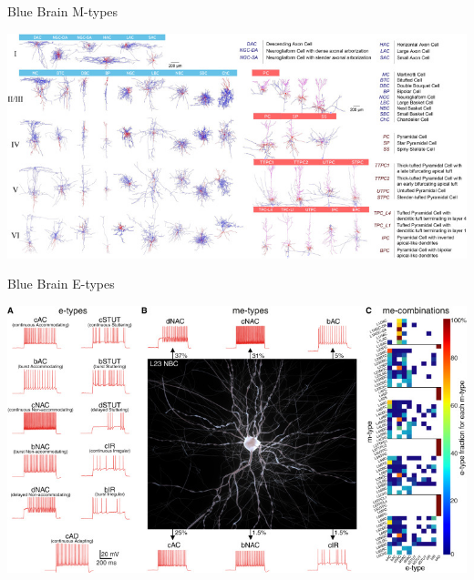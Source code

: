 \documentclass[aspectratio=169]{beamer}
\begin{document}
\begin{frame}{Blue Brain M-types}
    \begin{center}
        \includegraphics[width=\textwidth]{images/m-types.jpg}
    \end{center}
\end{frame}

\begin{frame}{Blue Brain E-types}
    \begin{center}
        \includegraphics[width=.9\textwidth]{images/e-types.jpg}
    \end{center}
\end{frame}
\end{document}
